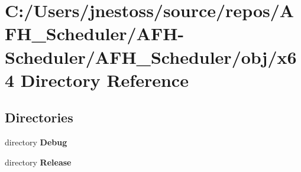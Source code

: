 \section{C\+:/\+Users/jnestoss/source/repos/\+A\+F\+H\+\_\+\+Scheduler/\+A\+F\+H-\/\+Scheduler/\+A\+F\+H\+\_\+\+Scheduler/obj/x64 Directory Reference}
\label{dir_3e717cd410b2d3528b0f51c40fd85296}
\subsection*{Directories}
\begin{DoxyCompactItemize}
\item 
directory \textbf{ Debug}
\item 
directory \textbf{ Release}
\end{DoxyCompactItemize}
